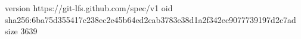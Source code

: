 version https://git-lfs.github.com/spec/v1
oid sha256:6ba75d355417c238ec2e45b64ed2cab3783e38d1a2f342ec9077739197d2c7ad
size 3639
